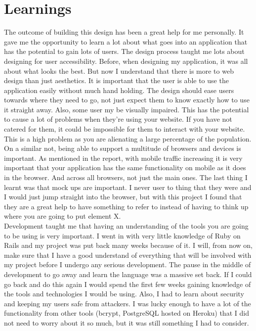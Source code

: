 \section{Learnings}
The outcome of building this design has been a great help for me personally. It gave me the opportunity to learn a lot about what goes into an application that has the potential to gain lots of users. The design process taught me lots about designing for user accessibility. Before, when designing my application, it was all about what looks the best. But now I understand that there is more to web design than just aesthetics. It is important that the user is able to use the application easily without much hand holding. The design should ease users towards where they need to go, not just expect them to know exactly how to use it straight away. Also, some user my be visually impaired. This has the potential to cause a lot of problems when they're using your website. If you have not catered for them, it could be impossible for them to interact with your website. This is a high problem as you are alienating a large percentage of the population. On a similar not, being able to support a multitude of browsers and devices is important. As mentioned in the report, with mobile traffic increasing it is very important that your application has the same functionality on mobile as it does in the browser. And across all browsers, not just the main ones. The last thing I learnt was that mock ups are important. I never user to thing that they were and I would just jump straight into the browser, but with this project I found that they are a great help to have something to refer to instead of having to think up where you are going to put element X.\\

Development taught me that having an understanding of the tools you are going to be using is very important. I went in with very little knowledge of Ruby on Rails and my project was put back many weeks because of it. I will, from now on, make sure that I have a good understand of everything that will be involved with my project before I undergo any serious development. The pause in the middle of development to go away and learn the language was a massive set back. If I could go back and do this again I would spend the first few weeks gaining knowledge of the tools and technologies I would be using. Also, I had to learn about security and keeping my users safe from attackers. I was lucky enough to have a lot of the functionality from other tools (bcrypt, PostgreSQL hosted on Heroku) that I did not need to worry about it so much, but it was still something I had to consider.\\

